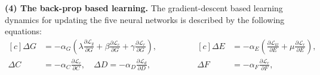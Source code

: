 \documentclass{article}
\newcommand\todo[1]{\textcolor{red}{#1}}
\begin{document}





{\bf (4) The back-prop based learning.} The gradient-descent based learning dynamics for updating the five neural networks is described by the following equations:
\begin{equation*}
\begin{aligned}[c]
\Delta G &= -\alpha_G \left(\lambda \frac{\partial \mathcal{L}_g}{\partial G}+\beta\frac{\partial \mathcal{L}_c}{\partial G} +\gamma\frac{\partial \mathcal{L}_r}{\partial G}\right),\\
\Delta C &= -\alpha_C \frac{\partial \mathcal{L}_c}{\partial C},
\quad \Delta D = -\alpha_D \frac{\partial \mathcal{L}_d}{\partial D} ,
\end{aligned}
\qquad\qquad
\begin{aligned}[c]
\Delta E &= -\alpha_E \left(\frac{\partial \mathcal{L}_{kl}}{\partial E} +\mu \frac{\partial \mathcal{L}_r}{\partial E}\right) ,\\
\Delta F &= -\alpha_F \frac{\partial \mathcal{L}_r}{\partial F} ,
\end{aligned}
\end{equation*}
\end{document}
